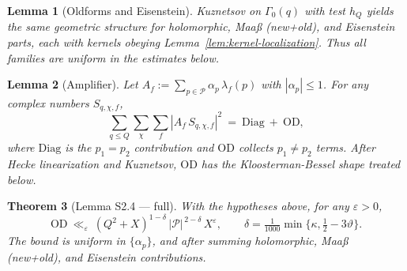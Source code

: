 \documentclass[11pt]{article}
\newtheorem{lemma}{Lemma}[section]
\newtheorem{theorem}[lemma]{Theorem}
\theoremstyle{definition}
\theoremstyle{remark}
\begin{document}
\begin{lemma}[Oldforms and Eisenstein]\label{lem:old-eis}
	Kuznetsov on $\Gamma_0(q)$ with test $h_Q$ yields the same geometric structure for holomorphic, Maaß (new+old), and Eisenstein parts, each with kernels obeying Lemma~\ref{lem:kernel-localization}. Thus all families are uniform in the estimates below.
\end{lemma}

\begin{lemma}[Amplifier]\label{lem:amplifier}
	Let $A_f:=\sum_{p\in\mathcal P}\alpha_p\,\lambda_f(p)$ with $|\alpha_p|\le 1$. For any complex numbers $S_{q,\chi,f}$,
	\[
		\sum_{q\le Q}\sum_{\chi}\sum_f |A_f\,S_{q,\chi,f}|^2
		\ =\ \mathrm{Diag}\ +\ \mathrm{OD},
	\]
	where $\mathrm{Diag}$ is the $p_1=p_2$ contribution and $\mathrm{OD}$ collects $p_1\ne p_2$ terms. After Hecke linearization and Kuznetsov, $\mathrm{OD}$ has the Kloosterman-Bessel shape treated below.
\end{lemma}

\begin{theorem}[Lemma S2.4 — full]\label{lem:S2.4}
	With the hypotheses above, for any $\varepsilon>0$,
	\[
		\mathrm{OD}\ \ll_{\varepsilon}\ (Q^2+X)^{1-\delta}\,|\mathcal P|^{\,2-\delta}\,X^{\varepsilon},
		\qquad
		\delta=\tfrac1{1000}\min\{\kappa,\tfrac12-3\vartheta\}.
	\]
	The bound is uniform in $\{\alpha_p\}$, and after summing holomorphic, Maaß (new+old), and Eisenstein contributions.
\end{theorem}
\end{document}
